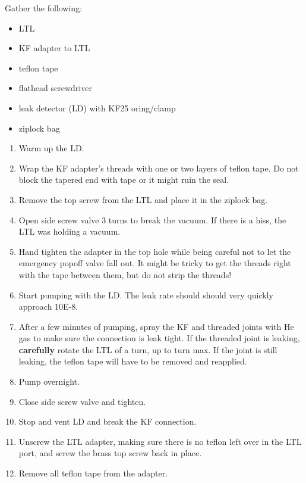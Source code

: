 \begin{minipage}{.95\linewidth}
Gather the following:

\begin{itemize}
 \item LTL
\item KF adapter to LTL
\item teflon tape
\item flathead screwdriver
\item leak detector (LD) with KF25 oring/clamp
\item ziplock bag
\end{itemize}
\end{minipage}


\begin{enumerate}
 \item Warm up the LD.
\item Wrap the KF adapter's threads with one or two layers of teflon tape.  Do not block the tapered end with tape or it might ruin the seal.
\item Remove the top screw from the LTL and place it in the ziplock bag.
\item Open side screw valve 3 turns to break the vacuum.  If there is a hiss, the LTL was holding a vacuum.
\item Hand tighten the adapter in the top hole while being careful not to let the emergency popoff valve fall out.  It might be tricky to get the threads right with the tape between them, but do not strip the threads!
\item Start pumping with the LD.  The leak rate should should very quickly approach 10E-8.
\item After a few minutes of pumping, spray the KF and threaded joints with He gas to make sure the connection is leak tight.  If the threaded joint is leaking, \textbf{carefully} rotate the LTL  of a turn, up to  turn max.  If the joint is still leaking, the teflon tape will have to be removed and reapplied.
\item Pump overnight.
\item Close side screw valve and tighten.
\item Stop and vent LD and break the KF connection.
\item Unscrew the LTL adapter, making sure there is no teflon left over in the LTL port, and screw the brass top screw back in place.
\item Remove all teflon tape from the adapter.
\end{enumerate}


